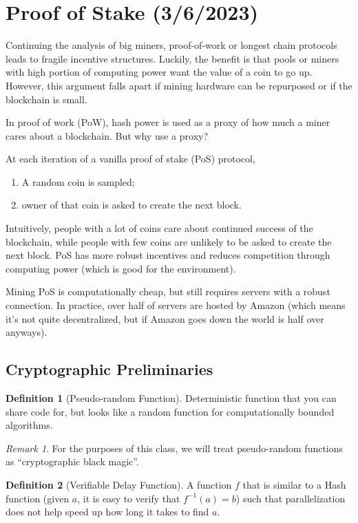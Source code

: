 \documentclass[dvipsnames]{article}
\theoremstyle{definition}
\newtheorem{definition}{Definition}[section]
\theoremstyle{remark}
\newtheorem*{remark}{Remark}
\begin{document}
\newpage

\section{Proof of Stake (3/6/2023)}

Continuing the analysis of big miners, proof-of-work or longest chain protocols leads to fragile incentive structures. Luckily, the benefit is that pools or miners with high portion of computing power want the value of a coin to go up. However, this argument falls apart if mining hardware can be repurposed or if the blockchain is small.

In proof of work (PoW), hash power is used as a proxy of how much a miner cares about a blockchain. But why use a proxy?

At each iteration of a vanilla proof of stake (PoS) protocol,
\begin{enumerate}
	\item A random coin is sampled;
	\item owner of that coin is asked to create the next block.
\end{enumerate}
Intuitively, people with a lot of coins care about continued success of the blockchain, while people with few coins are unlikely to be asked to create the next block. PoS has more robust incentives and reduces competition through computing power (which is good for the environment).

Mining PoS is computationally cheap, but still requires servers with a robust connection. In practice, over half of servers are hosted by Amazon (which means it's not quite decentralized, but if Amazon goes down the world is half over anyways). 

\subsection{Cryptographic Preliminaries}

\begin{definition}[Pseudo-random Function]
	Deterministic function that you can share code for, but looks like a random function for computationally bounded algorithms. 
\end{definition}
\begin{remark}
	For the purposes of this class, we will treat pseudo-random functions as ``cryptographic black magic''.
\end{remark}

\begin{definition}[Verifiable Delay Function]
	A function $f$ that is similar to a Hash function (given $a$, it is easy to verify that $f^{-1}(a) = b$) such that parallelization does not help speed up how long it takes to find $a$.
\end{definition}
\end{document}
